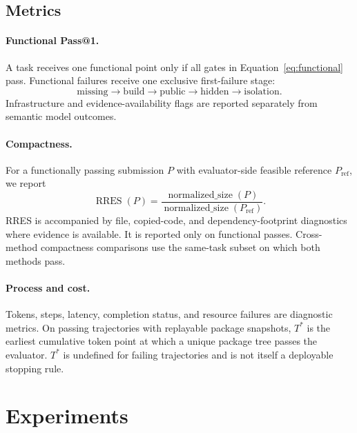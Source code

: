 \documentclass[acmsmall,anonymous,review,screen]{acmart}
\newcommand{\rres}{\textsc{RRES}\xspace}
\begin{document}
\subsection{Metrics}

\paragraph{Functional Pass@1.}
A task receives one functional point only if all gates in
Equation~\ref{eq:functional} pass. Functional failures receive one exclusive
first-failure stage:
\begin{equation}
  \text{missing} \rightarrow \text{build} \rightarrow \text{public}
  \rightarrow \text{hidden} \rightarrow \text{isolation}.
\end{equation}
Infrastructure and evidence-availability flags are reported separately from
semantic model outcomes.

\paragraph{Compactness.}
For a functionally passing submission $P$ with evaluator-side feasible
reference $P_{\mathrm{ref}}$, we report
\begin{equation}
  \operatorname{RRES}(P)
  = \frac{\operatorname{normalized\_size}(P)}
         {\operatorname{normalized\_size}(P_{\mathrm{ref}})}.
  \label{eq:rres}
\end{equation}
\rres is accompanied by file, copied-code, and dependency-footprint
diagnostics where evidence is available. It is reported only on functional
passes. Cross-method compactness comparisons use the same-task subset on which
both methods pass.

\paragraph{Process and cost.}
Tokens, steps, latency, completion status, and resource failures are diagnostic
metrics. On passing trajectories with replayable package snapshots, $T^*$ is
the earliest cumulative token point at which a unique package tree passes the
evaluator. $T^*$ is undefined for failing trajectories and is not itself a
deployable stopping rule.

\section{Experiments}
\label{sec:experiments}
\end{document}
